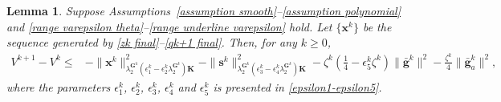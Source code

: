 \documentclass[12pt,draftcls,onecolumn]{IEEEtran}
\newtheorem{lemma}{Lemma}
\begin{document}
\begin{lemma}
	Suppose Assumptions~\ref{assumption smooth}--\ref{assumption polynomial} and \eqref{range varepsilon theta}--\eqref{range underline varepsilon} hold. Let $\{\mathbf{x}^k\}$ be the sequence generated by \eqref{zk final}--\eqref{qk+1 final}. Then, for any $k \geq 0$,
	\begin{align}
		V^{k+1} - V^k\leq & - \|\mathbf{x}^k\|^2_{\lambda_{2}^{\mathbf{G}^k} ({\epsilon_1^k} - {\epsilon_2^k} \lambda_{2}^{\mathbf{G}^k})\mathbf{K} }- \|\mathbf{s}^k \|^2_{ \lambda_{2}^{\mathbf{G}^k}({\epsilon_3^k} - \epsilon_4^k \lambda_{2}^{\mathbf{G}^k}) \mathbf{K}}- {\zeta^k}(\frac{1}{4} - {\epsilon_{5}^k} {\zeta^k}) \|\bar{\mathbf{g}}^k\|^2 - \frac{{\zeta^k}}{4}\|\bar{\mathbf{g}}_a^k\|^2, \label{tilde Vk+1-tilde Vk}
	\end{align}
	where the parameters $\epsilon_1^k$, $\epsilon_2^k$, $\epsilon_3^k$, $\epsilon_4^k$ and $\epsilon_{5}^k$ is presented in \eqref{epsilon1-epsilon5}.
\end{lemma}
\end{document}

